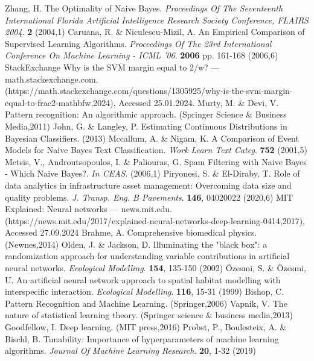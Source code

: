 \documentclass[sn-mathphys-num]{sn-jnl}%
\begin{document}
\begin{thebibliography}{000}
Zhang, H. The Optimality of Naive Bayes. {\em Proceedings Of The Seventeenth International Florida Artificial Intelligence Research Society Conference, FLAIRS 2004}. \textbf{2} (2004,1)
Caruana, R. \& Niculescu-Mizil, A. An Empirical Comparison of Supervised Learning Algorithms. {\em Proceedings Of The 23rd International Conference On Machine Learning - ICML '06}. \textbf{2006} pp. 161-168 (2006,6)
StackExchange Why is the SVM margin equal to 2/w? — math.stackexchange.com. (https://math.stackexchange.com/questions/1305925/why-is-the-svm-margin-equal-to-frac2-mathbfw,2024), Accessed 25.01.2024.
Murty, M. \& Devi, V. Pattern recognition: An algorithmic approach. (Springer Science & Business Media,2011)
John, G. \& Langley, P. Estimating Continuous Distributions in Bayesian Classifiers.  (2013)
Mccallum, A. \& Nigam, K. A Comparison of Event Models for Naive Bayes Text Classification. {\em Work Learn Text Categ}. \textbf{752} (2001,5)
Metsis, V., Androutsopoulos, I. \& Paliouras, G. Spam Filtering with Naive Bayes - Which Naive Bayes?. {\em In CEAS}. (2006,1)
Piryonesi, S. \& El-Diraby, T. Role of data analytics in infrastructure asset management: Overcoming data size and quality problems. {\em J. Transp. Eng. B Pavements}. \textbf{146}, 04020022 (2020,6)
MIT Explained: Neural networks — news.mit.edu. (https://news.mit.edu/2017/explained-neural-networks-deep-learning-0414,2017), Accessed 27.09.2024
Brahme, A. Comprehensive biomedical physics. (Newnes,2014)
Olden, J. \& Jackson, D. Illuminating the "black box": a randomization approach for understanding variable contributions in artificial neural networks. {\em Ecological Modelling}. \textbf{154}, 135-150 (2002)
Özesmi, S. \& Özesmi, U. An artificial neural network approach to spatial habitat modelling with interspecific interaction. {\em Ecological Modelling}. \textbf{116}, 15-31 (1999)
Bishop, C. Pattern Recognition and Machine Learning. (Springer,2006)
Vapnik, V. The nature of statistical learning theory. (Springer science & business media,2013)
Goodfellow, I. Deep learning. (MIT press,2016)
Probst, P., Boulesteix, A. \& Bischl, B. Tunability: Importance of hyperparameters of machine learning algorithms. {\em Journal Of Machine Learning Research}. \textbf{20}, 1-32 (2019)

\end{thebibliography}
\end{document}
